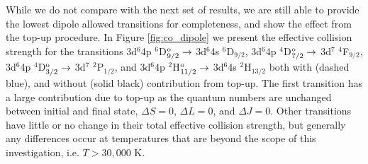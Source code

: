 While we do not compare with the next set of results, we are still able to provide the lowest dipole allowed transitions for completeness, and show the effect from the top-up procedure. In Figure \ref{fig:co_dipole} we present the effective collision strength for the transitions 3d$^6$4p $^6$D$^{{\rm o}}_{9/2} \rightarrow$ 3d$^6$4s $^6$D$_{9/2}$, 3d$^6$4p $^4$D$^{{\rm o}}_{7/2} \rightarrow$ 3d$^7$ $^4$F$_{9/2}$, 3d$^6$4p $^4$D$^{{\rm o}}_{3/2} \rightarrow$ 3d$^7$ $^2$P$_{1/2}$, and 3d$^6$4p $^2$H$^{{\rm o}}_{11/2} \rightarrow$ 3d$^6$4s $^2$H$_{13/2}$ both with (dashed blue), and without (solid black) contribution from top-up. The first transition has a large contribution due to top-up as the quantum numbers are unchanged between initial and final state, $\Delta S = 0$, $\Delta L = 0$, and $\Delta J = 0$. Other transitions have little or no change in their total effective collision strength, but generally any differences occur at temperatures that are beyond the scope of this investigation, i.e. $T>30,000$ K.

\newpage

